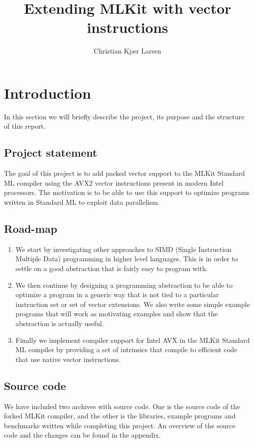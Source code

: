 \documentclass{article}
\title{Extending MLKit with vector instructions}
\author{Christian Kjær Larsen}
\begin{document}
\maketitle

\tableofcontents

\section{Introduction}

In this section we will briefly describe the project, its purpose and the structure of this report.

\subsection{Project statement}

The goal of this project is to add packed vector support to the MLKit\cite{mlkit} Standard ML compiler using the AVX2 vector instructions present in modern Intel processors. The motivation is to be able to use this support to optimize programs written in Standard ML to exploit data parallelism.

\subsection{Road-map}

\begin{enumerate}
    \item We start by investigating other approaches to SIMD (Single Instruction Multiple Data) programming in higher level languages. This is in order to settle on a
        good abstraction that is fairly easy to program with.
    \item
        We then continue by designing a programming abstraction to be able to optimize a program in a generic way that is not tied to a particular instruction set or set of vector extensions.
        We also write some simple example programs that will work as motivating examples and show that the abstraction is actually useful.
    \item
        Finally we implement compiler support for Intel AVX in the MLKit Standard ML compiler by providing a set of intrinsics that compile to efficient code that use native vector instructions.
\end{enumerate}

\subsection{Source code}
We have included two archives with source code. One is the source code of the forked MLKit compiler, and the other is the libraries, example programs and benchmarks written while completing this project. An overview of the source code and the changes can be found in the appendix.
\end{document}
